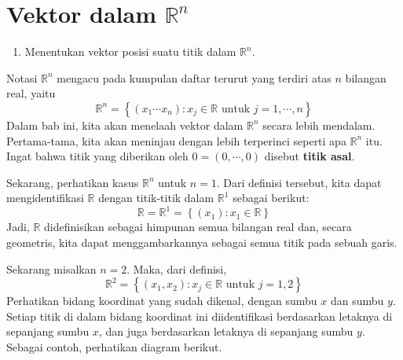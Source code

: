 \section{Vektor dalam $\mathbb{R}^n$}

\begin{outcome}

\begin{enumerate}
\item[A.] Menentukan vektor posisi suatu titik dalam $\mathbb{R}^n$.
\end{enumerate}
\end{outcome}

Notasi $\mathbb{R}^{n}$ mengacu pada kumpulan daftar terurut yang terdiri atas
$n$ bilangan real, yaitu
\[
\mathbb{R}^{n} = \left\{ \left( x_{1}\cdots x_{n}\right)
:x_{j}\in \mathbb{R}\text{ untuk }j=1,\cdots ,n\right\}
\]
Dalam bab ini, kita akan menelaah vektor dalam $\mathbb{R}^n$ secara lebih mendalam. Pertama-tama, kita akan meninjau dengan lebih terperinci seperti apa
$\mathbb{R}^n$ itu. Ingat bahwa titik yang diberikan oleh $0=\left( 0, \cdots, 0 \right)$ disebut \textbf{titik asal}.

Sekarang, perhatikan kasus $\mathbb{R}^n$ untuk $n=1.$ Dari definisi tersebut, kita dapat mengidentifikasi
$\mathbb{R}$ dengan titik-titik dalam $\mathbb{R}^{1}$ sebagai berikut:
\begin{equation*}
\mathbb{R} = \mathbb{R}^{1}=
 \left\{ \left( x_{1}\right) :x_{1}\in \mathbb{R} \right\}
\end{equation*}
Jadi, $\mathbb{R}$ didefinisikan sebagai himpunan semua bilangan real dan, secara geometris,
kita dapat menggambarkannya sebagai semua titik pada sebuah garis.

Sekarang misalkan $n=2$. Maka, dari definisi,
\begin{equation*}
\mathbb{R}^{2}=
\left\{ \left(x_{1}, x_{2}\right)
:x_{j}\in \mathbb{R}\text{ untuk }j=1,2 \right\}
\end{equation*}
Perhatikan bidang koordinat yang sudah dikenal, dengan sumbu $x$ dan sumbu $y$. Setiap titik
di dalam bidang koordinat ini diidentifikasi berdasarkan letaknya
di sepanjang sumbu $x$, dan juga berdasarkan letaknya di sepanjang sumbu $y$.
Sebagai contoh, perhatikan diagram berikut.

